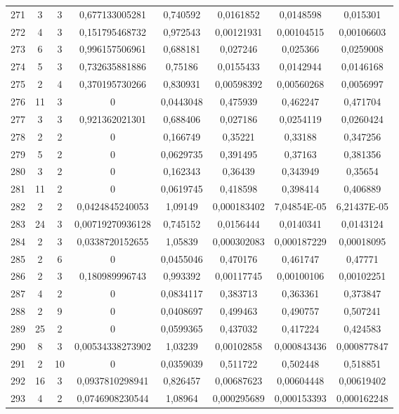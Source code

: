 \begin{longtable}{|c|c|c|c|c|c|c|c|}
271 & 3 & 3 & 0,677133005281 & 0,740592 & 0,0161852 & 0,0148598 & 0,015301  \\
272 & 4 & 3 & 0,151795468732 & 0,972543 & 0,00121931 & 0,00104515 & 0,00106603  \\
273 & 6 & 3 & 0,996157506961 & 0,688181 & 0,027246 & 0,025366 & 0,0259008  \\
274 & 5 & 3 & 0,732635881886 & 0,75186 & 0,0155433 & 0,0142944 & 0,0146168  \\
275 & 2 & 4 & 0,370195730266 & 0,830931 & 0,00598392 & 0,00560268 & 0,0056997  \\
276 & 11 & 3 & 0 & 0,0443048 & 0,475939 & 0,462247 & 0,471704  \\
277 & 3 & 3 & 0,921362021301 & 0,688406 & 0,027186 & 0,0254119 & 0,0260424  \\
278 & 2 & 2 & 0 & 0,166749 & 0,35221 & 0,33188 & 0,347256  \\
279 & 5 & 2 & 0 & 0,0629735 & 0,391495 & 0,37163 & 0,381356  \\
280 & 3 & 2 & 0 & 0,162343 & 0,36439 & 0,343949 & 0,35654  \\
281 & 11 & 2 & 0 & 0,0619745 & 0,418598 & 0,398414 & 0,406889  \\
282 & 2 & 2 & 0,0424845240053 & 1,09149 & 0,000183402 & 7,04854E-05 & 6,21437E-05  \\
283 & 24 & 3 & 0,00719270936128 & 0,745152 & 0,0156444 & 0,0140341 & 0,0143124  \\
284 & 2 & 3 & 0,0338720152655 & 1,05839 & 0,000302083 & 0,000187229 & 0,00018095  \\
285 & 2 & 6 & 0 & 0,0455046 & 0,470176 & 0,461747 & 0,47771  \\
286 & 2 & 3 & 0,180989996743 & 0,993392 & 0,00117745 & 0,00100106 & 0,00102251  \\
287 & 4 & 2 & 0 & 0,0834117 & 0,383713 & 0,363361 & 0,373847  \\
288 & 2 & 9 & 0 & 0,0408697 & 0,499463 & 0,490757 & 0,507241  \\
289 & 25 & 2 & 0 & 0,0599365 & 0,437032 & 0,417224 & 0,424583  \\
290 & 8 & 3 & 0,00534338273902 & 1,03239 & 0,00102858 & 0,000843436 & 0,000877847  \\
291 & 2 & 10 & 0 & 0,0359039 & 0,511722 & 0,502448 & 0,518851  \\
292 & 16 & 3 & 0,0937810298941 & 0,826457 & 0,00687623 & 0,00604448 & 0,00619402  \\
293 & 4 & 2 & 0,0746908230544 & 1,08964 & 0,000295689 & 0,000153393 & 0,000162248  \\

\end{longtable}
